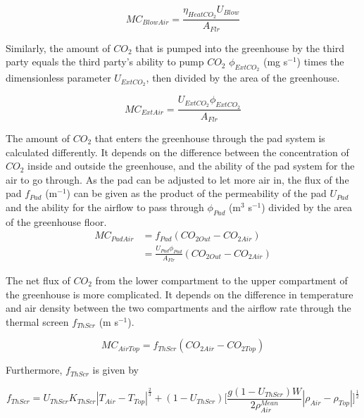 \documentclass[a4paper]{article}
\begin{document}
\begin{equation}
  MC_{BlowAir} = \frac{\eta_{HeatCO_2}U_{Blow}}{A_{Flr}}
\end{equation}

Similarly, the amount of \(CO_2\) that is pumped into the greenhouse by the third party equals the third party's ability to pump \(CO_2\) \(\phi_{ExtCO_2}\) (mg s\(^{-1}\)) times the dimensionless parameter \(U_{ExtCO_2}\), then divided by the area of the greenhouse.

\begin{equation}
  MC_{ExtAir} = \frac{U_{ExtCO_2}\phi_{ExtCO_2}}{A_{Flr}}
\end{equation}

The amount of \(CO_2\) that enters the greenhouse through the pad system is calculated differently.
It depends on the difference between the concentration of \(CO_2\) inside and outside the greenhouse, and the ability of the pad system for the air to go through.
As the pad can be adjusted to let more air in, the flux of the pad \(f_{Pad}\) (m\(^{-1}\)) can be given as the product of the permeability of the pad \(U_{Pad}\) and the ability for the airflow to pass through \(\phi_{Pad}\) (m\(^3\) s\(^{-1}\)) divided by the area of the greenhouse floor.
\begin{equation}
  \begin{split}
    MC_{PadAir} & = f_{Pad} (CO_{2 Out} - CO_{2 Air}) \\
    & = \frac{U_{Pad} \phi_{Pad}}{A_{Flr}} (CO_{2 Out} - CO_{2 Air})
  \end{split}
\end{equation}

The net flux of \(CO_2\) from the lower compartment to the upper compartment of the greenhouse is more complicated.
It depends on the difference in temperature and air density between the two compartments and the airflow rate through the thermal screen \(f_{ThScr}\) (m s\(^{-1}\)).

\begin{equation}
  MC_{AirTop} = f_{ThScr} (CO_{2 Air} - CO_{2 Top})
\end{equation}

Furthermore, $f_{ThScr}$ is given by

\begin{equation}
  f_{ThScr} = U_{ThScr} K_{ThScr} |T_{Air} - T_{Top}| ^{\frac{2}{3}} + (1 - U_{ThScr}) \Bigg[\frac{g(1 - U_{ThScr})W}{2\rho^{Mean}_{Air}} |\rho_{Air} - \rho_{Top}|\Bigg]^{\frac{1}{2}}
\end{equation}
\end{document}
